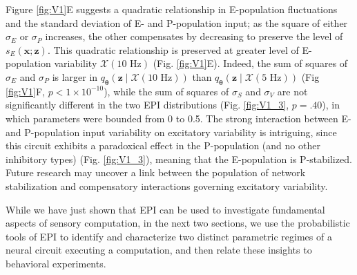 \documentclass[11pt]{article}
\begin{document}
Figure \ref{fig:V1}E suggests a quadratic relationship in E-population fluctuations and the standard deviation of E- and P-population input; as the square of either $\sigma_E$ or $\sigma_P$ increases, the other compensates by decreasing to preserve the level of $s_E(\mathbf{x}; \mathbf{z})$.
This quadratic relationship is preserved at greater level of E-population variability $\mathcal{X}(10\text{ Hz})$ (Fig. \ref{fig:V1}E).
Indeed, the sum of squares of $\sigma_E$ and $\sigma_P$ is larger in $q_{\bm{\theta}}(\mathbf{z} \mid \mathcal{X}(10\text{ Hz}))$ than $q_{\bm{\theta}}(\mathbf{z} \mid \mathcal{X}(5\text{ Hz}))$ (Fig \ref{fig:V1}F, $p < 1 \times 10^{-10}$), while the sum of squares of $\sigma_S$ and $\sigma_V$ are not significantly different in the two EPI distributions (Fig. \ref{fig:V1_3}, $p=.40$), in which parameters were bounded from 0 to 0.5.
The strong interaction between E- and P-population input variability on excitatory variability is intriguing, since this circuit exhibits a paradoxical effect in the P-population (and no other inhibitory types) (Fig. \ref{fig:V1_3}), meaning that the E-population is P-stabilized.
Future research may uncover a link between the population of network stabilization and compensatory interactions governing excitatory variability.

While we have just shown that EPI can be used to investigate fundamental aspects of sensory computation, in the next two sections, we use the probabilistic tools of EPI to identify and characterize two distinct parametric regimes of a neural circuit executing a computation, and then relate these insights to behavioral experiments.
\end{document}
